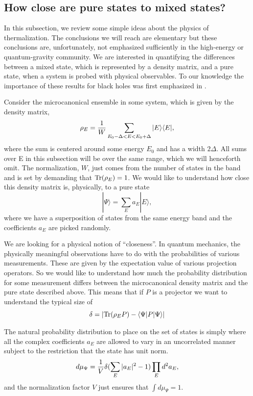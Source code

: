 \documentclass[12pt]{article}
\def\tr{{\rm Tr}}
\newcommand{\be}{\begin{equation}}
\newcommand{\ee}{\end{equation}}
\begin{document}
\subsection{How close are pure states to mixed states?\label{puremixed}}
In this subsection, we review some simple ideas about the physics of thermalization. The conclusions we will reach are elementary but these conclusions are, unfortunately,  not emphasized sufficiently in the high-energy or quantum-gravity
community.  We are interested in quantifying the differences between a mixed state, which is represented by a density matrix, and a pure state, when a system is probed with physical observables. To our knowledge the importance
of these results for black holes was first emphasized in  \cite{lloyd1988black}.

Consider the microcanonical ensemble in some system, which is given by the density
matrix, 
\be
\label{microcan}
\rho_{E} = {1 \over W} \sum_{E_0 - \Delta < E < E_0 + \Delta}  |E \rangle \langle E|,
\ee
where the sum is centered around some energy $E_0$ and has a width $2 \Delta$. All sums over E in this subsection will be over the same range, which we will henceforth omit. The normalization, $W$, just comes from the number of states in the band and is set by demanding that $\tr(\rho_{E}) = 1$.  We would like to understand how close this density matrix is, physically, to a pure state
\be
\label{puremicro}
|\Psi \rangle = \sum_{E}  a_{E} | E \rangle,
\ee
where we have a superposition of  states from the same energy band and the coefficients $a_{E}$ are picked randomly. 

We are looking for a physical notion of ``closeness''. In quantum mechanics, the physically meaningful observations have to do with the probabilities of various measurements. These are given by the expectation value of various projection operators. So we would like to understand how much the probability distribution for some measurement differs between the microcanonical density matrix and the pure state described above. This means that if $P$ is a projector we want to understand the typical size of 
\[
\delta = \left| \tr(\rho_{E} P) - \langle \Psi | P | \Psi \rangle \right|
\]

The natural probability distribution to place on the set of states is simply where all the complex coefficients $a_{E}$ are allowed to vary in an uncorrelated manner subject to the restriction that the state has unit norm.
\be
\label{haarmeasure}
d \mu_{\Psi} = {1 \over V} \delta(\sum_{E} |a_{E}|^2 - 1)\prod_{E}  d^2 a_{E}, 
\ee
and the normalization factor $V$ just ensures that $\int d \mu_{\Psi} = 1$. 
\end{document}
